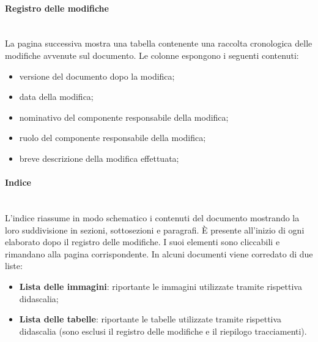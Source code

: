             \paragraph{Registro delle modifiche}\mbox{}\\ [1mm]
                La pagina successiva mostra una tabella contenente una raccolta cronologica delle modifiche avvenute sul documento.
                Le colonne espongono i seguenti contenuti:
                \begin{itemize}
                    \item versione del documento dopo la modifica;
                    \item data della modifica;
                    \item nominativo del componente responsabile della modifica;
                    \item ruolo del componente responsabile della modifica;
                    \item breve descrizione della modifica effettuata;
                \end{itemize}
            \paragraph{Indice}\mbox{}\\ [1mm]
                L'indice riassume in modo schematico i contenuti del documento mostrando la loro suddivisione in sezioni, sottosezioni e paragrafi.
                È presente all'inizio di ogni elaborato dopo il registro delle modifiche. I suoi elementi sono cliccabili e rimandano alla pagina
                corrispondente. In alcuni documenti viene corredato di due liste:
                \begin{itemize}
                    \item \textbf{Lista delle immagini}: riportante le immagini utilizzate tramite rispettiva didascalia;
                    \item \textbf{Lista delle tabelle}: riportante le tabelle utilizzate tramite rispettiva didascalia (sono esclusi il registro delle modifiche
                                                        e il riepilogo tracciamenti).
                \end{itemize}
